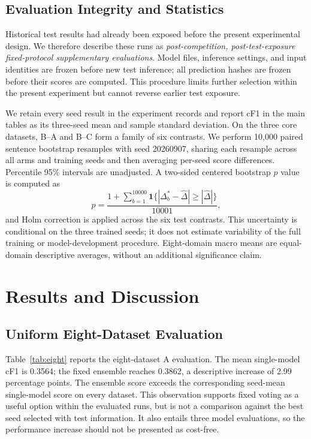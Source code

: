 \documentclass[conference]{IEEEtran}
\begin{document}
\subsection{Evaluation Integrity and Statistics}
Historical test results had already been exposed before the present experimental design. We therefore describe these runs as \emph{post-competition, post-test-exposure fixed-protocol supplementary evaluations}. Model files, inference settings, and input identities are frozen before new test inference; all prediction hashes are frozen before their scores are computed. This procedure limits further selection within the present experiment but cannot reverse earlier test exposure.

We retain every seed result in the experiment records and report cF1 in the main tables as its three-seed mean and sample standard deviation. On the three core datasets, B--A and B--C form a family of six contrasts. We perform 10,000 paired sentence bootstrap resamples with seed 20260907, sharing each resample across all arms and training seeds and then averaging per-seed score differences. Percentile 95\% intervals are unadjusted. A two-sided centered bootstrap $p$ value is computed as
\begin{equation}
 p=\frac{1+\sum_{b=1}^{10000}\mathbf{1}\{|\Delta_b^*-\widehat\Delta|\geq|\widehat\Delta|\}}{10001},
\end{equation}
and Holm correction is applied across the six test contrasts. This uncertainty is conditional on the three trained seeds; it does not estimate variability of the full training or model-development procedure. Eight-domain macro means are equal-domain descriptive averages, without an additional significance claim.

\section{Results and Discussion}
\subsection{Uniform Eight-Dataset Evaluation}

Table~\ref{tab:eight} reports the eight-dataset A evaluation. The mean single-model cF1 is 0.3564; the fixed ensemble reaches 0.3862, a descriptive increase of 2.99 percentage points. The ensemble score exceeds the corresponding seed-mean single-model score on every dataset. This observation supports fixed voting as a useful option within the evaluated runs, but is not a comparison against the best seed selected with test information. It also entails three model evaluations, so the performance increase should not be presented as cost-free.
\end{document}
